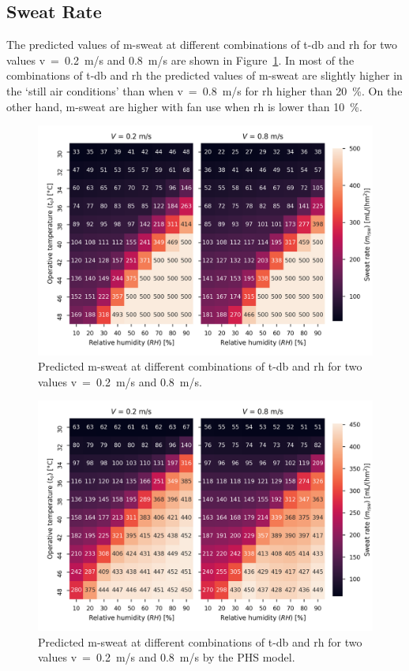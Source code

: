 \subsection{Sweat Rate}\label{subsec:sweat-rate}

The predicted values of \ac{m-sweat} at different combinations of \ac{t-db} and \ac{rh} for two values \acf{v}~=~0.2~m/s and 0.8~m/s are shown in Figure~\ref{fig:sweat_rate}.
In most of the combinations of \acf{t-db} and \acf{rh} the predicted values of \ac{m-sweat} are slightly higher in the `still air conditions' than when \ac{v}~=~0.8~m/s for \ac{rh} higher than 20~\%.
On the other hand, \ac{m-sweat} are higher with fan use when \ac{rh} is lower than 10~\%.


\begin{figure}[thb!]
    \centering
    \includegraphics[width=\textwidth]{figures/sweat_rate}
    \caption{Predicted \acf{m-sweat} at different combinations of \acf{t-db} and \acf{rh} for two values \acf{v}~=~0.2~m/s and 0.8~m/s.}
    \label{fig:sweat_rate}
\end{figure}

\begin{figure}[thb!]
    \centering
    \includegraphics[width=\textwidth]{figures/sweat_rate_phs}
    \caption{Predicted \acf{m-sweat} at different combinations of \acf{t-db} and \acf{rh} for two values \acf{v}~=~0.2~m/s and 0.8~m/s by the PHS model.}
    \label{fig:sweat_rate_phs}
\end{figure}

